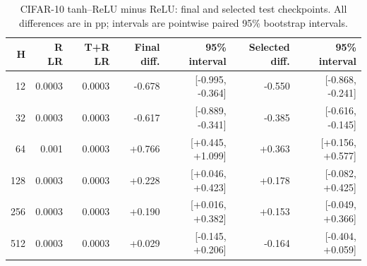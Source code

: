 \begin{table}[htbp]
\centering
\caption{CIFAR-10 tanh--ReLU minus ReLU: final and selected test checkpoints. All differences are in pp; intervals are pointwise paired 95\% bootstrap intervals.}
\label{tab:endpoints}
\footnotesize
\begin{tabular}{@{}rrrrrrr@{}}
\toprule
H & R LR & T+R LR & Final diff. & 95\% interval & Selected diff. & 95\% interval \\
\midrule
12 & 0.0003 & 0.0003 & -0.678 & [-0.995, -0.364] & -0.550 & [-0.868, -0.241] \\
32 & 0.0003 & 0.0003 & -0.617 & [-0.889, -0.341] & -0.385 & [-0.616, -0.145] \\
64 & 0.001 & 0.0003 & +0.766 & [+0.445, +1.099] & +0.363 & [+0.156, +0.577] \\
128 & 0.0003 & 0.0003 & +0.228 & [+0.046, +0.423] & +0.178 & [-0.082, +0.425] \\
256 & 0.0003 & 0.0003 & +0.190 & [+0.016, +0.382] & +0.153 & [-0.049, +0.366] \\
512 & 0.0003 & 0.0003 & +0.029 & [-0.145, +0.206] & -0.164 & [-0.404, +0.059] \\
\bottomrule
\end{tabular}
\par{}
\end{table}
